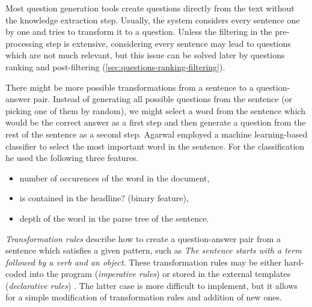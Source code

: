 \documentclass[a4paper, 12pt, twoside]{fithesis2}		%
\renewcommand{\_}{\leavevmode \kern0.07em\vbox{\hrule width0.4em}}
\newcommand{\squarebullet}{\textcolor{black}{\raisebox{0.15em}{\rule{4pt}{4pt}}}}
\newcommand{\emptysquarebullet}{\textcolor{black}{\raisebox{0.10em}{\tiny$\square$}}}
\newenvironment{myItemize}{
  \begin{itemize}[leftmargin=2em,rightmargin=1em,itemsep=\parskip ,parsep=0em,topsep=0em,partopsep=0em]
  \renewcommand{\labelitemi}{\squarebullet}
  \renewcommand{\labelitemii}{\textbullet}
}{
  \end{itemize}
}
\begin{document}
Most question generation tools create questions directly from the text without the knowledge extraction step.
Usually, the system considers every sentence one by one
and tries to transform it to a question.
Unless the filtering in the pre-processing step is extensive,
considering every sentence may lead to questions which are not much relevant,
but this issue can be solved later by questions ranking and post-filtering
(\autoref{sec:questions-ranking-filtering}).

There might be more possible transformations from a sentence to a question-answer pair.
Instead of generating all possible questions from the sentence (or picking one of them by random),
we might select a word from the sentence which would be the correct answer as a first step and then generate a question from the rest of the sentence as a second step.
Agarwal \cite{question-gen-textbooks} employed a machine learning-based classifier to select the most important word in the sentence. For the classification he used the following three features.
\begin{myItemize}
\item number of occurences of the word in the document,
\item is contained in the headline? (binary feature),
\item depth of the word in the parse tree of the sentence.
\end{myItemize}

\textit{Transformation rules} describe how to create a question-answer pair from a sentence
which satisfies a given pattern,
such as \textit{The sentence starts with a term followed by a verb and an object}.
These transformation rules may be either hard-coded into the program (\textit{imperative rules})
\cite{questions-wolfe, question-overgenerating-rating, question-gen-connectives}
or stored in the external templates (\textit{declarative rules})
\cite{question-gen-ceist, questions-eval}.
The latter case is more difficult to implement, but it allows for a simple modification of transformation rules and addition of new ones.
\end{document}
